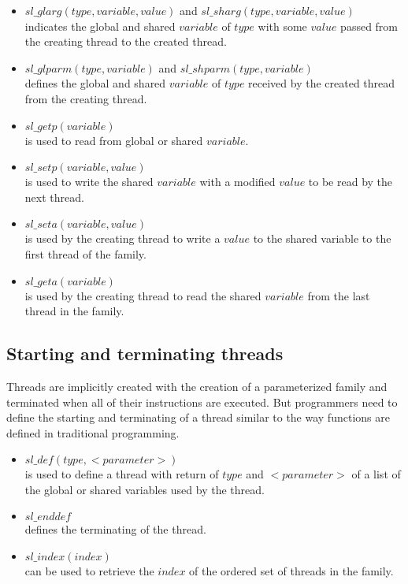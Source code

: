 \documentclass{article}
\begin{document}
\begin{itemize}

\item $sl\_glarg(type, variable, value)$ and $sl\_sharg(type, variable,
    value)$\\ indicates the global and shared $variable$ of $type$ with some
    $value$ passed from the creating thread to the created thread.

\item $sl\_glparm(type, variable)$ and $sl\_shparm(type, variable)$\\ defines
    the global and shared $variable$ of $type$ received by the created thread
    from the creating thread.

\item $sl\_getp(variable)$ \\ is used to read from global or shared
    $variable$.

\item $sl\_setp(variable, value)$ \\ is used to write the shared $variable$
    with a modified $value$ to be read by the next thread.

\item $sl\_seta(variable, value)$ \\ is used by the creating thread to write a
    $value$ to the shared variable to the first thread of the family.

\item $sl\_geta(variable)$ \\ is used by the creating thread to read the shared
    $variable$ from the last thread in the family. 

\end{itemize}

\subsection*{Starting and terminating threads}

Threads are implicitly created with the creation of a parameterized family and
terminated when all of their instructions are executed. But programmers need to
define the starting and terminating of a thread similar to the way functions
are defined in traditional programming.

\begin{itemize}

\item $sl\_def(type, <parameter>)$\\ is used to define a thread with return of
    $type$ and $<parameter>$ of a list of the global or shared variables used
    by the thread. 

\item $sl\_enddef$ \\ defines the terminating of the thread. 

\item $sl\_index(index)$ \\ can be used to retrieve the $index$ of the ordered
    set of threads in the family.

\end{itemize}
\end{document}

